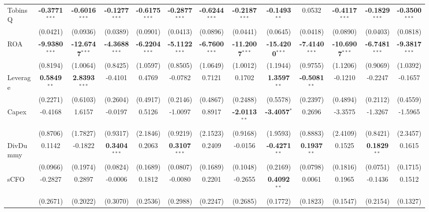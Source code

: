 \begin{landscape}
\begin{table}[H]
\begin{tabular}{lcccccccccccc}
TobinsQ & \textbf{-0.3771}$^{***}$ & \textbf{-0.6016}$^{***}$ & \textbf{-0.1277}$^{***}$ & \textbf{-0.6175}$^{***}$ & \textbf{-0.2877}$^{***}$ & \textbf{-0.6244}$^{***}$ & \textbf{-0.2187}$^{***}$ & \textbf{-0.1493}$^{**}$ & 0.0532 & \textbf{-0.4117}$^{***}$ & \textbf{-0.1829}$^{***}$ & \textbf{-0.3500}$^{***}$ \\
 & (0.0421) & (0.0936) & (0.0389) & (0.0901) & (0.0413) & (0.0896) & (0.0441) & (0.0645) & (0.0418) & (0.0890) & (0.0403) & (0.0818) \\
ROA & \textbf{-9.9380}$^{***}$ & \textbf{-12.6747}$^{***}$ & \textbf{-4.3688}$^{***}$ & \textbf{-6.2204}$^{***}$ & \textbf{-5.1122}$^{***}$ & \textbf{-6.7600}$^{***}$ & \textbf{-11.2007}$^{***}$ & \textbf{-15.4200}$^{***}$ & \textbf{-7.4140}$^{***}$ & \textbf{-10.6907}$^{***}$ & \textbf{-6.7481}$^{***}$ & \textbf{-9.3817}$^{***}$ \\
 & (0.8194) & (1.0064) & (0.8425) & (1.0597) & (0.8505) & (1.0649) & (1.0012) & (1.1944) & (0.9755) & (1.1206) & (0.9069) & (1.0392) \\
Leverage & \textbf{0.5849}$^{**}$ & \textbf{2.8393}$^{***}$ & -0.4101 & 0.4769 & -0.0782 & 0.7121 & 0.1702 & \textbf{1.3597}$^{**}$ & \textbf{-0.5081}$^{**}$ & -0.1210 & -0.2247 & -0.1657 \\
 & (0.2271) & (0.6103) & (0.2604) & (0.4917) & (0.2146) & (0.4867) & (0.2488) & (0.5578) & (0.2397) & (0.4894) & (0.2112) & (0.4559) \\
Capex & -0.4168 & 1.6157 & -0.0197 & 0.5126 & -1.0097 & 0.8917 & \textbf{-2.0113}$^{**}$ & \textbf{-3.4057}$^{*}$ & 0.2696 & -3.3575 & -1.3267 & -1.5965 \\
 & (0.8706) & (1.7827) & (0.9317) & (2.1846) & (0.9219) & (2.1523) & (0.9168) & (1.9593) & (0.8883) & (2.4109) & (0.8421) & (2.3457) \\
DivDummy & 0.1142 & -0.1822 & \textbf{0.3404}$^{***}$ & 0.2063 & \textbf{0.3107}$^{***}$ & 0.2409 & -0.0156 & \textbf{-0.4271}$^{**}$ & \textbf{0.1937}$^{**}$ & 0.1525 & \textbf{0.1829}$^{**}$ & 0.1615 \\
 & (0.0966) & (0.1974) & (0.0824) & (0.1689) & (0.0807) & (0.1689) & (0.1048) & (0.2169) & (0.0798) & (0.1816) & (0.0751) & (0.1715) \\
sCFO & -0.2827 & 0.2897 & -0.0006 & 0.1812 & -0.0080 & 0.2201 & -0.2655 & \textbf{0.4092}$^{**}$ & 0.0061 & 0.1965 & -0.1436 & 0.1512 \\
 & (0.2671) & (0.2022) & (0.3070) & (0.2536) & (0.2988) & (0.2247) & (0.2685) & (0.1772) & (0.1823) & (0.1547) & (0.2154) & (0.1327) \\

\end{tabular}
\end{table}
\end{landscape}
